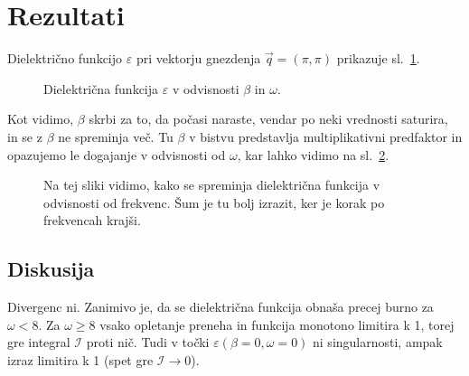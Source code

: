 \documentclass[a4paper, 12pt]{article}
\newcommand{\vq}{
	\ensuremath{\vec{q}}
}
\newcommand{\w}{
	\ensuremath{\omega}
}
\renewcommand{\ni}{
	\noindent
}
\newcommand{\I}{
	\ensuremath{\mathcal{I}}
}
\begin{document}
\section{Rezultati}

Dielektri\v cno funkcijo $\varepsilon$ pri vektorju gnezdenja $\vq = (\pi, \pi)$ prikazuje
sl.~\ref{sl2}.

\begin{figure}[H]
	\centering
	
	\caption{Dielektri\v cna funkcija $\varepsilon$ v odvisnosti $\beta$ in $\omega$.}
	\label{sl2}
\end{figure}

\ni Kot vidimo, $\beta$ skrbi za to, da po\v casi naraste, vendar po neki vrednosti saturira,
in se z $\beta$ ne spreminja ve\v c. Tu $\beta$ v bistvu predstavlja multiplikativni
predfaktor in opazujemo le dogajanje v odvisnosti od $\w$, kar lahko vidimo na sl.~\ref{sl1}.

\begin{figure}[H]
	\centering
	
	\caption{Na tej sliki vidimo, kako se spreminja dielektri\v cna funkcija v odvisnosti
		od frekvenc. \v Sum je tu bolj izrazit, ker je korak po frekvencah kraj\v si.}
	\label{sl1}
\end{figure}

\subsection{Diskusija}

Divergenc ni. Zanimivo je, da se dielektri\v cna funkcija obna\v sa precej burno za
$\w < 8$. Za $\w \geq 8$ vsako opletanje preneha in funkcija monotono limitira k 1, torej
gre integral $\I$ proti ni\v c. Tudi v to\v cki $\varepsilon (\beta = 0, \w = 0)$ ni
singularnosti, ampak izraz limitira k 1 (spet gre $\I \to 0$).
\end{document}
